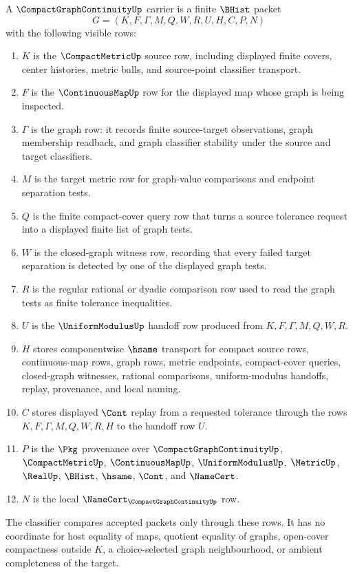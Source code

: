 \begin{definition}
\label{def:compact-graph-continuity-carrier}
A $\CompactGraphContinuityUp$ carrier is a finite $\BHist$ packet
$$
G=(K,F,\Gamma,M,Q,W,R,U,H,C,P,N)
$$
with the following visible rows:
\begin{enumerate}
\item $K$ is the $\CompactMetricUp$ source row, including displayed finite covers, center histories, metric balls, and source-point classifier transport.
\item $F$ is the $\ContinuousMapUp$ row for the displayed map whose graph is being inspected.
\item $\Gamma$ is the graph row: it records finite source-target observations, graph membership readback, and graph classifier stability under the source and target classifiers.
\item $M$ is the target metric row for graph-value comparisons and endpoint separation tests.
\item $Q$ is the finite compact-cover query row that turns a source tolerance request into a displayed finite list of graph tests.
\item $W$ is the closed-graph witness row, recording that every failed target separation is detected by one of the displayed graph tests.
\item $R$ is the regular rational or dyadic comparison row used to read the graph tests as finite tolerance inequalities.
\item $U$ is the $\UniformModulusUp$ handoff row produced from $K,F,\Gamma,M,Q,W,R$.
\item $H$ stores componentwise $\hsame$ transport for compact source rows, continuous-map rows, graph rows, metric endpoints, compact-cover queries, closed-graph witnesses, rational comparisons, uniform-modulus handoffs, replay, provenance, and local naming.
\item $C$ stores displayed $\Cont$ replay from a requested tolerance through the rows $K,F,\Gamma,M,Q,W,R,H$ to the handoff row $U$.
\item $P$ is the $\Pkg$ provenance over $\CompactGraphContinuityUp$, $\CompactMetricUp$, $\ContinuousMapUp$, $\UniformModulusUp$, $\MetricUp$, $\RealUp$, $\BHist$, $\hsame$, $\Cont$, and $\NameCert$.
\item $N$ is the local $\NameCert_{\CompactGraphContinuityUp}$ row.
\end{enumerate}
The classifier compares accepted packets only through these rows. It has no coordinate for host equality of maps, quotient equality of graphs, open-cover compactness outside $K$, a choice-selected graph neighbourhood, or ambient completeness of the target.
\end{definition}


